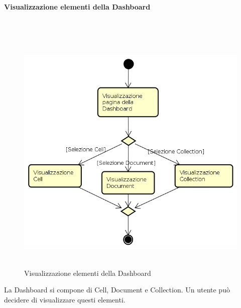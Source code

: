 \paragraph{Visualizzazione elementi della Dashboard} \mbox{} \\
\begin{figure}[H]
\begin{center}
\includegraphics[height=12cm]{res/sections/backend/activities/visualizzazioneElementDashboard.png}
\caption{Visualizzazione elementi della Dashboard}
\end{center}
\end{figure}
La Dashboard si compone di Cell, Document e Collection. Un utente può decidere di visualizzare questi elementi.
\newpage
